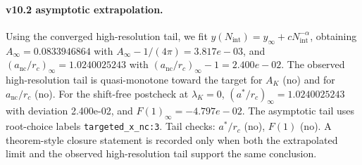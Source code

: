 \paragraph{v10.2 asymptotic extrapolation.}
Using the converged high-resolution tail, we fit $y(N_{\mathrm{int}})=y_{\infty}+cN_{\mathrm{int}}^{-\alpha}$, obtaining $A_\infty=0.0833946864$ with $A_\infty-1/(4\pi)=3.817e-03$, and $(a_{\mathrm{nc}}/r_c)_\infty=1.0240025243$ with $(a_{\mathrm{nc}}/r_c)_\infty-1=2.400e-02$. The observed high-resolution tail is quasi-monotone toward the target for $A_K$ (no) and for $a_{\mathrm{nc}}/r_c$ (no). For the shift-free postcheck at $\lambda_K=0$, $(a^*/r_c)_\infty=1.0240025243$ with deviation 2.400e-02, and $F(1)_\infty=-4.797e-02$. The asymptotic tail uses root-choice labels \texttt{targeted_x_nc:3}. Tail checks: $a^*/r_c$ (no), $F(1)$ (no). A theorem-style closure statement is recorded only when both the extrapolated limit and the
observed high-resolution tail support the same conclusion.
